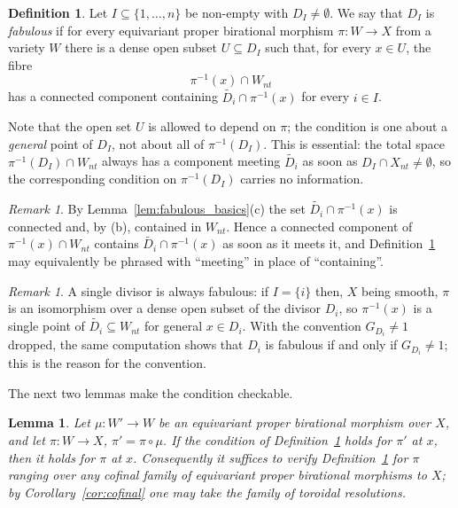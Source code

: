 \documentclass[11pt]{amsart}
\theoremstyle{plain}
\newtheorem{lemma}[theorem]{Lemma}
\theoremstyle{definition}
\newtheorem{definition}[theorem]{Definition}
\theoremstyle{remark}
\newtheorem{remark}[theorem]{Remark}
\numberwithin{equation}{section}
\begin{document}
\begin{definition} \label{def:fabulous}
Let $I \subseteq \{1,\ldots,n\}$ be non-empty with $D_I \neq \emptyset$.
We say that $D_I$ is \emph{fabulous} if for every equivariant proper
birational morphism $\pi : W \to X$ from a variety $W$ there is a dense
open subset $U \subseteq D_I$ such that, for every $x \in U$, the fibre
\[
\pi^{-1}(x) \cap W_{nt}
\]
has a connected component containing $\widetilde{D_i} \cap \pi^{-1}(x)$
for every $i \in I$.
\end{definition}

Note that the open set $U$ is allowed to depend on $\pi$; the condition is
one about a \emph{general} point of $D_I$, not about all of
$\pi^{-1}(D_I)$.  This is essential: the total space $\pi^{-1}(D_I) \cap
W_{nt}$ always has a component meeting $\widetilde{D_i}$ as soon as
$D_I \cap X_{nt} \neq \emptyset$, so the corresponding condition on
$\pi^{-1}(D_I)$ carries no information.

\begin{remark} \label{rem:meet_vs_contain}
By Lemma~\ref{lem:fabulous_basics}(c) the set $\widetilde{D_i} \cap
\pi^{-1}(x)$ is connected and, by (b), contained in $W_{nt}$.  Hence a
connected component of $\pi^{-1}(x) \cap W_{nt}$ contains
$\widetilde{D_i} \cap \pi^{-1}(x)$ as soon as it meets it, and
Definition~\ref{def:fabulous} may equivalently be phrased with
``meeting'' in place of ``containing''.
\end{remark}

\begin{remark} \label{rem:fabulous_divisor}
A single divisor is always fabulous: if $I = \{i\}$ then, $X$ being smooth,
$\pi$ is an isomorphism over a dense open subset of the divisor $D_i$, so
$\pi^{-1}(x)$ is a single point of $\widetilde{D_i} \subseteq W_{nt}$ for
general $x \in D_i$.  With the convention $G_{D_i} \neq 1$ dropped, the
same computation shows that $D_i$ is fabulous if and only if
$G_{D_i} \neq 1$; this is the reason for the convention.
\end{remark}

The next two lemmas make the condition checkable.

\begin{lemma} \label{lem:fabulous_cofinal}
Let $\mu : W' \to W$ be an equivariant proper birational morphism over $X$,
and let $\pi : W \to X$, $\pi' = \pi \circ \mu$.  If the condition of
Definition~\ref{def:fabulous} holds for $\pi'$ at $x$, then it holds for
$\pi$ at $x$.  Consequently it suffices to verify
Definition~\ref{def:fabulous} for $\pi$ ranging over any cofinal family of
equivariant proper birational morphisms to $X$; by
Corollary~\ref{cor:cofinal} one may take the family of toroidal
resolutions.
\end{lemma}
\end{document}
